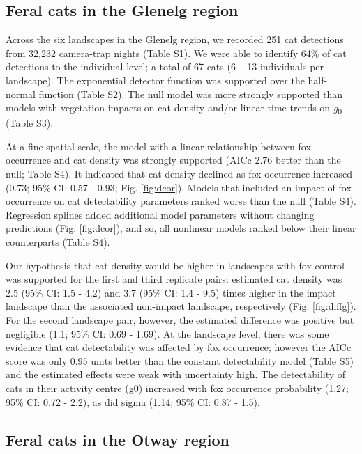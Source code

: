 \documentclass[]{elsarticle} %
\begin{document}
\hypertarget{feral-cats-in-the-glenelg-region}{%
\subsection{Feral cats in the Glenelg region}\label{feral-cats-in-the-glenelg-region}}

Across the six landscapes in the Glenelg region, we recorded 251 cat detections from 32,232 camera-trap nights (Table S1). We were able to identify 64\% of cat detections to the individual level; a total of 67 cats (6 -- 13 individuals per landscape). The exponential detector function was supported over the half-normal function (Table S2). The null model was more strongly supported than models with vegetation impacts on cat density and/or linear time trends on \emph{g}\textsubscript{0} (Table S3).

At a fine spatial scale, the model with a linear relationship between fox occurrence and cat density was strongly supported (AICc 2.76 better than the null; Table S4). It indicated that cat density declined as fox occurrence increased (0.73; 95\% CI: 0.57 - 0.93; Fig. \ref{fig:dcor}). Models that included an impact of fox occurrence on cat detectability parameters ranked worse than the null (Table S4). Regression splines added additional model parameters without changing predictions (Fig. \ref{fig:dcor}), and so, all nonlinear models ranked below their linear counterparts (Table S4).

Our hypothesis that cat density would be higher in landscapes with fox control was supported for the first and third replicate pairs: estimated cat density was 2.5 (95\% CI: 1.5 - 4.2) and 3.7 (95\% CI: 1.4 - 9.5) times higher in the impact landscape than the associated non-impact landscape, respectively (Fig. \ref{fig:diffg}). For the second landscape pair, however, the estimated difference was positive but negligible (1.1; 95\% CI: 0.69 - 1.69). At the landscape level, there was some evidence that cat detectability was affected by fox occurrence; however the AICc score was only 0.95 units better than the constant detectability model (Table S5) and the estimated effects were weak with uncertainty high. The detectability of cats in their activity centre (g0) increased with fox occurrence probability (1.27; 95\% CI: 0.72 - 2.2), as did sigma (1.14; 95\% CI: 0.87 - 1.5).

\hypertarget{feral-cats-in-the-otway-region}{%
\subsection{Feral cats in the Otway region}\label{feral-cats-in-the-otway-region}}
\end{document}
